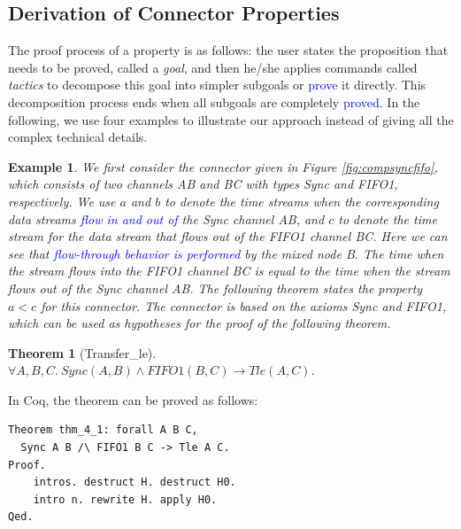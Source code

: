 \documentclass[preprint,3p]{elsarticle}
\newcommand{\liyi}[1]{\textcolor{blue}{#1}}
\newcommand{\xy}[1]{{#1}}
\newtheorem{example}{Example}[section]
\newtheorem{theorem}{Theorem}[section]
\begin{document}
\subsection{Derivation of Connector Properties}
The proof process of a property is as follows: the user states the proposition that needs to be proved, called a \emph{goal},
\xy{and then he/she} applies commands called \emph{tactics} to decompose this goal into simpler subgoals or \liyi{prove} it directly. This decomposition
process ends when all subgoals are completely \liyi{proved}. In the following, \xy{we use four examples} to illustrate our approach instead of
giving all the complex technical details.
\begin{example}
We first consider the connector given in Figure \ref{fig:compsyncfifo}, which consists of two channels \emph{AB} and \emph{BC} with types Sync and FIFO1, respectively.
We use $a$ and $b$ to denote the time streams when the corresponding data streams \liyi{flow in and out of} the Sync channel \emph{AB}, and
$c$ to denote the time stream for the data stream that flows out of the FIFO1 channel \emph{BC}. Here we can see that \liyi{flow-through
behavior is performed} by the mixed node \emph{B}. The time when the stream flows into the FIFO1 channel \emph{BC} is equal to the time when the
stream flows out of the Sync channel \emph{AB}. The following theorem states the property $a < c$ for this connector. The connector is based on the
axioms Sync and FIFO1, which can be used as hypotheses for the proof of the following theorem.
\end{example}

\begin{theorem}[Transfer\_le]\label{the:tleac}
$\forall A,B,C.\:Sync(A,B)\land FIFO1(B,C) \rightarrow Tle(A,C)$.
\end{theorem}

In Coq, the theorem can be proved as follows:
\begin{lstlisting}[language=coq]
Theorem thm_4_1: forall A B C,
  Sync A B /\ FIFO1 B C -> Tle A C.
Proof.
    intros. destruct H. destruct H0.
    intro n. rewrite H. apply H0.
Qed.
\end{lstlisting}
\end{document}
